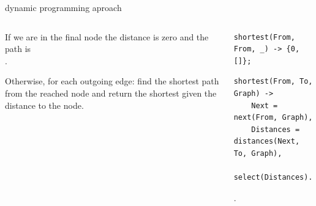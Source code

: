 \begin{frame}[fragile]{dynamic programming aproach}

\begin{columns}
 \begin{column}{0.4\linewidth}
  If we are in the final node the distance is zero and the path is \[\].

  \vspace{10pt}
  Otherwise, for each outgoing edge: find the shortest path from the
  reached node and return the shortest given the distance to the node.

 \end{column}
 \begin{column}{0.6\linewidth}
  \begin{verbatim}
shortest(From, From, _) -> {0, []};
  \end{verbatim}
  \pause
  \begin{verbatim}
shortest(From, To, Graph) ->
    Next = next(From, Graph),
    Distances = distances(Next, To, Graph),
    select(Distances).
  \end{verbatim}
  .
 \end{column}
\end{columns}



\end{frame}

